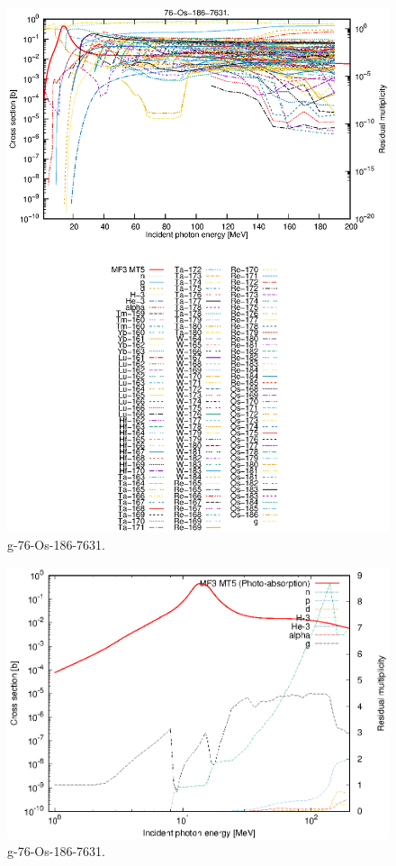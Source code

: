 \begin{figure}
 \includegraphics[width=\linewidth]{eps/g_76-Os-186_7631.eps}
  \caption{g-76-Os-186-7631.}
\end{figure}
\newpage \clearpage

\begin{figure}
 \includegraphics[width=\linewidth]{eps-log/g_76-Os-186_7631.eps}
 \caption{g-76-Os-186-7631.}
\end{figure}
\newpage \clearpage

